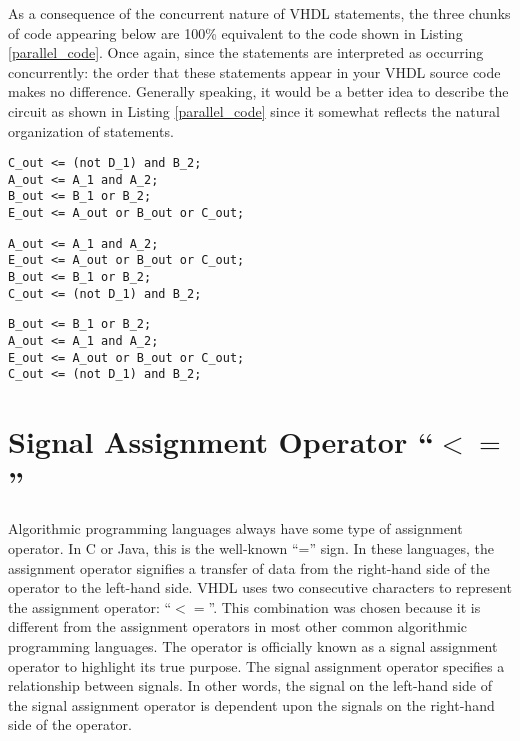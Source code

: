 As a consequence of the concurrent nature of VHDL statements, the three chunks of code appearing below are 100\% equivalent to the code shown in Listing \ref{parallel_code}. Once again, since the statements are interpreted as occurring concurrently: the order that these statements appear in your VHDL source code makes no difference. Generally speaking, it would be a better idea to describe the circuit as shown in Listing \ref{parallel_code} since it somewhat reflects the natural organization of statements.

\noindent
\begin{minipage}{0.99\linewidth}
\begin{lstlisting}[label=parallel_code_2, caption=Equivalent VHDL code for the circuit of Figure 4.1. ]
C_out <= (not D_1) and B_2; 
A_out <= A_1 and A_2;   
B_out <= B_1 or B_2; 
E_out <= A_out or B_out or C_out;
\end{lstlisting}
\begin{lstlisting}[label=parallel_code_3, caption=Equivalent VHDL code for the circuit of Figure 4.1.]
A_out <= A_1 and A_2;   
E_out <= A_out or B_out or C_out;
B_out <= B_1 or B_2; 
C_out <= (not D_1) and B_2; 
\end{lstlisting}
\begin{lstlisting}[label=parallel_code_4, caption=Equivalent VHDL code for the circuit of Figure 4.1.]
B_out <= B_1 or B_2; 
A_out <= A_1 and A_2;   
E_out <= A_out or B_out or C_out;
C_out <= (not D_1) and B_2; 
\end{lstlisting}
\end{minipage}

\section{Signal Assignment Operator ``$<=$''}
Algorithmic programming languages always have some type of assignment operator. In C or Java, this is the well-known ``='' sign. In these languages, the assignment operator signifies a transfer of data from the right-hand side of the operator to the left-hand side. VHDL uses two consecutive characters to represent the assignment operator: ``\texttt{$<=$}''. This combination was chosen because it is different from the assignment operators in most other common algorithmic programming languages. The operator is officially known as a signal assignment operator to highlight its true purpose. The signal assignment operator specifies a relationship between signals. In other words, the signal on the left-hand side of the signal assignment operator is dependent upon the signals on the right-hand side of the operator.

